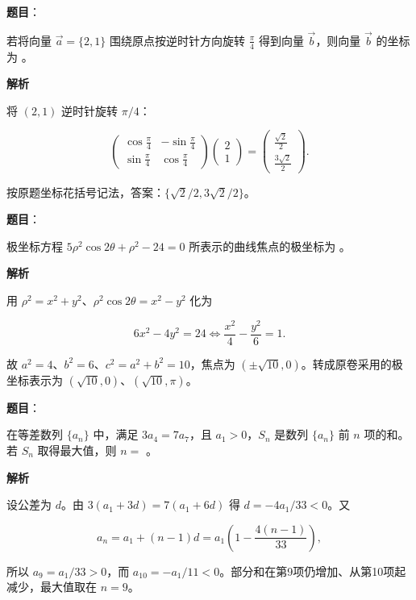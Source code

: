 \begin{answer}

\textbf{题目}：

若将向量 $\vec a=\{2,1\}$ 围绕原点按逆时针方向旋转 $\frac\pi4$ 得到向量 $\vec b$，则向量 $\vec b$ 的坐标为 \gkblank{}。

\textbf{解析}

将 $(2,1)$ 逆时针旋转 $\pi/4$：

\nopagebreak[4]
\[
\begin{pmatrix}\cos\frac\pi4&-\sin\frac\pi4\\\sin\frac\pi4&\cos\frac\pi4\end{pmatrix}
\begin{pmatrix}2\\1\end{pmatrix}
=\begin{pmatrix}\frac{\sqrt2}{2}\\\frac{3\sqrt2}{2}\end{pmatrix}.
\]

按原题坐标花括号记法，答案：$\{\sqrt2/2,3\sqrt2/2\}$。


\end{answer}
\begin{answer}

\textbf{题目}：

极坐标方程 $5\rho^2\cos2\theta+\rho^2-24=0$ 所表示的曲线焦点的极坐标为 \gkblank{}。

\textbf{解析}

用 $\rho^2=x^2+y^2$、$\rho^2\cos2\theta=x^2-y^2$ 化为

\nopagebreak[4]
\[
6x^2-4y^2=24\iff\frac{x^2}{4}-\frac{y^2}{6}=1.
\]

故 $a^2=4$、$b^2=6$、$c^2=a^2+b^2=10$，焦点为 $(\pm\sqrt{10},0)$。转成原卷采用的极坐标表示为 $(\sqrt{10},0)$、$(\sqrt{10},\pi)$。


\end{answer}
\begin{answer}

\textbf{题目}：

在等差数列 $\{a_n\}$ 中，满足 $3a_4=7a_7$，且 $a_1>0$，$S_n$ 是数列 $\{a_n\}$ 前 $n$ 项的和。若 $S_n$ 取得最大值，则 $n=$ \gkblank{}。

\textbf{解析}

设公差为 $d$。由 $3(a_1+3d)=7(a_1+6d)$ 得 $d=-4a_1/33<0$。又

\nopagebreak[4]
\[
a_n=a_1+(n-1)d=a_1\left(1-\frac{4(n-1)}{33}\right),
\]

所以 $a_9=a_1/33>0$，而 $a_{10}=-a_1/11<0$。部分和在第9项仍增加、从第10项起减少，最大值取在 $n=9$。


\end{answer}

